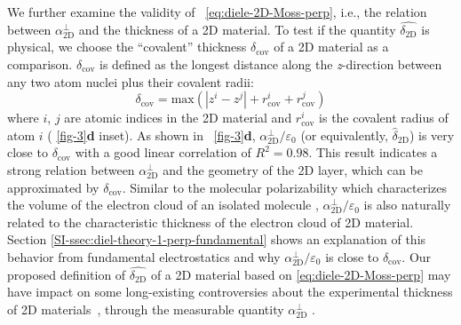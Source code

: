 We further examine the validity of ~\autoref{eq:diele-2D-Moss-perp}, i.e.,
the relation between $\alpha_{\mathrm{2D}}^{\perp}$ and the thickness
of a 2D material. To test if the quantity $\hat{\delta_{\mathrm{2D}}}$
is physical, we choose the ``covalent'' thickness
$\delta_{\mathrm{cov}}$ of a 2D material as a
comparison. $\delta_{\mathrm{cov}}$ is defined as the longest distance
along the \textit{z}-direction between any two atom nuclei plus their covalent
radii:
%
%
\begin{equation}
  \label{eq:diele-cov-thick}
  \delta_{\mathrm{cov}} = \mathrm{max}(|z^{i} - z^{j}|
  + r^{i}_{\mathrm{cov}} + r^{j}_{\mathrm{cov}})
\end{equation}
where $i$, $j$ are atomic indices in the 2D material and
$r_{\mathrm{cov}}^{i}$ is the covalent radius of atom $i$ (
\autoref{fig-3}{\textbf d} inset). As shown in ~\autoref{fig-3}{\textbf
  d}, $\alpha_{\mathrm{2D}}^{\perp}/\varepsilon_{0}$ (or equivalently,
$\hat{\delta}_{\mathrm{2D}}$) is very close to $\delta_{\mathrm{cov}}$
with a good linear correlation of $R^{2}=0.98$. This result indicates
a strong relation between $\alpha_{\mathrm{2D}}^{\perp}$ and the
geometry of the 2D layer, which can be approximated by
$\delta_{\mathrm{cov}}$. Similar to the molecular polarizability which
characterizes the volume of the electron cloud of an isolated molecule
\cite{Israelachvili_2011},
$\alpha_{\mathrm{2D}}^{\perp}/\varepsilon_{0}$ is also naturally
related to the characteristic thickness of the electron cloud of 2D
material.  Section
\autoref{SI-ssec:diel-theory-1-perp-fundamental} shows an explanation of this
behavior from fundamental electrostatics and why
$\alpha_{\mathrm{2D}}^{\perp} / \varepsilon_{0}$ is close to
$\delta_{\mathrm{cov}}$. Our proposed definition of
$\hat{\delta_{\mathrm{2D}}}$ of a 2D material based on
 \autoref{eq:diele-2D-Moss-perp} may have impact
on some long-existing controversies about the experimental thickness
of 2D materials~\cite{Shearer_2016}, through the
measurable quantity $\alpha_{\mathrm{2D}}^{\perp}$
\cite{Antoine_1999_polariz_C60,Cherniavskaya_2003_nanocryst_polariz,Krauss_1999_EFM}.
% 
%

